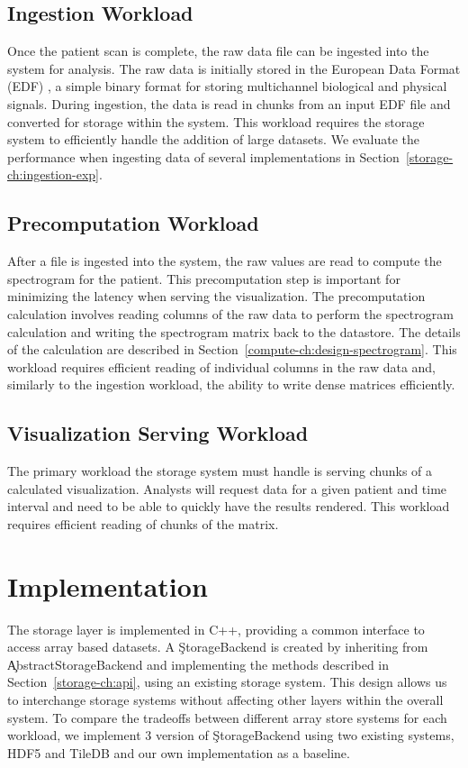 \subsection{Ingestion Workload}

Once the patient scan is complete, the raw data file can be ingested into the
system for analysis. The raw data is initially stored in the European Data
Format (EDF) \cite{edf}, a simple binary format for storing multichannel
biological and physical signals. During ingestion, the data is read in chunks
from an input EDF file and converted for storage within the system. This
workload requires the storage system to efficiently handle the addition of
large datasets. We evaluate the performance when ingesting data of several
implementations in Section~\ref{storage-ch:ingestion-exp}.


\subsection{Precomputation Workload}

After a file is ingested into the system, the raw values are read to compute
the spectrogram for the patient. This precomputation step is important for
minimizing the latency when serving the visualization. The precomputation
calculation involves reading columns of the raw data to perform the spectrogram
calculation and writing the spectrogram matrix back to the datastore. The
details of the calculation are described in
Section~\ref{compute-ch:design-spectrogram}. This workload requires efficient
reading of individual columns in the raw data and, similarly to the ingestion
workload, the ability to write dense matrices efficiently.

\subsection{Visualization Serving Workload}

The primary workload the storage system must handle is serving chunks of a
calculated visualization. Analysts will request data for a given patient and
time interval and need to be able to quickly have the results rendered. This
workload requires efficient reading of chunks of the matrix.

\section{Implementation}

The storage layer is implemented in C++, providing a common interface to access
array based datasets. A \c{StorageBackend} is created by inheriting from
\c{AbstractStorageBackend} and implementing the methods described in
Section~\ref{storage-ch:api}, using an existing storage system. This design
allows us to interchange storage systems without affecting other layers within
the overall system. To compare the tradeoffs between different array store
systems for each workload, we implement 3 version of \c{StorageBackend} using
two existing systems, HDF5 \cite{hdf5} and TileDB \cite{tiledb} and our own
implementation as a baseline. \\

